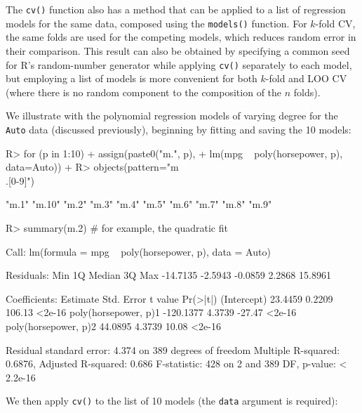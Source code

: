\documentclass[
]{jss}
\begin{document}
The \texttt{cv()} function also has a method that can be applied to a
list of regression models for the same data, composed using the
\texttt{models()} function. For \(k\)-fold CV, the same folds are used
for the competing models, which reduces random error in their
comparison. This result can also be obtained by specifying a common seed
for R's random-number generator while applying \texttt{cv()} separately
to each model, but employing a list of models is more convenient for
both \(k\)-fold and LOO CV (where there is no random component to the
composition of the \(n\) folds).

We illustrate with the polynomial regression models of varying degree
for the \texttt{Auto} data (discussed previously), beginning by fitting
and saving the 10 models:

\begin{CodeChunk}
\begin{CodeInput}
R> for (p in 1:10){
+   assign(paste0("m.", p),
+          lm(mpg ~ poly(horsepower, p), data=Auto))
+ }
R> objects(pattern="m\\.[0-9]")
\end{CodeInput}
\begin{CodeOutput}
 [1] "m.1"  "m.10" "m.2"  "m.3"  "m.4"  "m.5"  "m.6"  "m.7"  "m.8"  "m.9" 
\end{CodeOutput}
\begin{CodeInput}
R> summary(m.2) # for example, the quadratic fit
\end{CodeInput}
\begin{CodeOutput}

Call:
lm(formula = mpg ~ poly(horsepower, p), data = Auto)

Residuals:
     Min       1Q   Median       3Q      Max 
-14.7135  -2.5943  -0.0859   2.2868  15.8961 

Coefficients:
                      Estimate Std. Error t value Pr(>|t|)
(Intercept)            23.4459     0.2209  106.13   <2e-16
poly(horsepower, p)1 -120.1377     4.3739  -27.47   <2e-16
poly(horsepower, p)2   44.0895     4.3739   10.08   <2e-16

Residual standard error: 4.374 on 389 degrees of freedom
Multiple R-squared:  0.6876,    Adjusted R-squared:  0.686 
F-statistic:   428 on 2 and 389 DF,  p-value: < 2.2e-16
\end{CodeOutput}
\end{CodeChunk}

We then apply \texttt{cv()} to the list of 10 models (the \texttt{data}
argument is required):
\end{document}

